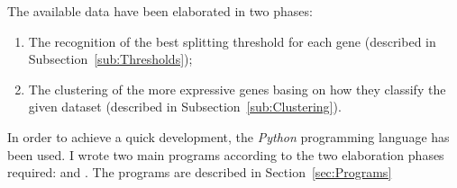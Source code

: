     The available data have been elaborated in two phases:
    \begin{enumerate}
    \item   The recognition of the best splitting threshold for each gene
             (described in Subsection~\ref{sub:Thresholds});
    \item   The clustering of the more expressive genes basing on how they
            classify the given dataset (described in
            Subsection~\ref{sub:Clustering}).
    \end{enumerate}

    In order to achieve a quick development, the \emph{Python} programming
    language has been used. I wrote two main programs according to the two
    elaboration phases required:  and
    . The programs are described in
    Section~\ref{sec:Programs}


